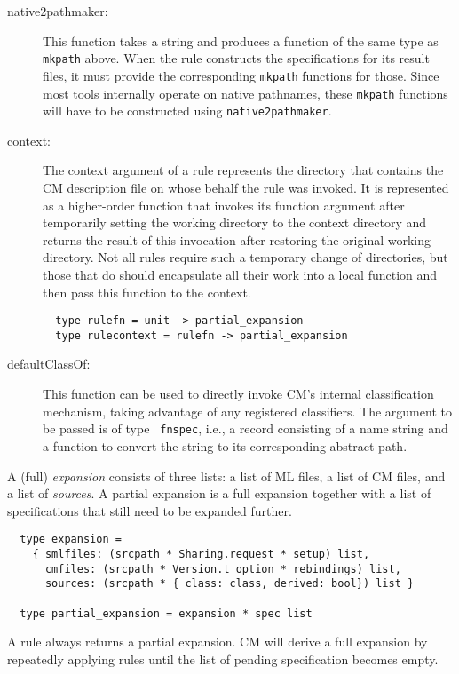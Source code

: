 \begin{description}
\item[native2pathmaker:] This function takes a string and produces a
function of the same type as {\tt mkpath} above.  When the rule
constructs the specifications for its result files, it must provide
the corresponding {\tt mkpath} functions for those.  Since most tools
internally operate on native pathnames, these {\tt mkpath} functions
will have to be constructed using {\tt native2pathmaker}.
\item[context:] The context argument of a rule represents the
directory that contains the CM description file on whose behalf the
rule was invoked.  It is represented as a higher-order function that
invokes its function argument after temporarily setting the working
directory to the context directory and returns the result of this
invocation after restoring the original working directory.  Not all
rules require such a temporary change of directories, but those that
do should encapsulate all their work into a local function and then
pass this function to the context.
\begin{lstlisting}
  type rulefn = unit -> partial_expansion
  type rulecontext = rulefn -> partial_expansion
\end{lstlisting}%
\item[defaultClassOf:] This function can be used to directly invoke
CM's internal classification mechanism, taking advantage of any
registered classifiers.  The argument to be passed is of type {\tt
fnspec}, i.e., a record consisting of a name string and a function to
convert the string to its corresponding abstract path.
\end{description}

A (full) {\em expansion} consists of three lists: a list of ML files,
a list of CM files, and a list of {\em sources}.  A partial expansion
is a full expansion together with a list of specifications that still
need to be expanded further.

\begin{lstlisting}
  type expansion =
    { smlfiles: (srcpath * Sharing.request * setup) list,
      cmfiles: (srcpath * Version.t option * rebindings) list,
      sources: (srcpath * { class: class, derived: bool}) list }

  type partial_expansion = expansion * spec list
\end{lstlisting}%

A rule always returns a partial expansion.  CM will derive a full
expansion by repeatedly applying rules until the list of pending
specification becomes empty.

